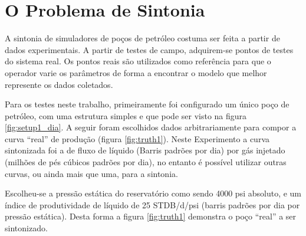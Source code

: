 
\chapter{O Problema de Sintonia} \label{chap:conc}
	

A sintonia de simuladores de poços de petróleo costuma ser feita a partir de dados experimentais. 
%
A partir de testes de campo, adquirem-se pontos de testes do sistema real.
%
Os pontos reais são utilizados como referência para que o operador varie os parâmetros de forma a encontrar o modelo que melhor represente os dados coletados.
%

Para os testes neste trabalho, primeiramente foi configurado um único poço de petróleo, com uma estrutura simples e que pode ser visto na figura \ref{fig:setup1_dia}.
% 
A seguir foram escolhidos dados arbitrariamente para compor a curva ``real'' de produção (figura \ref{fig:truth1}).
%
Neste Experimento a curva sintonizada foi a de fluxo de líquido (Barris padrões por dia) por gás injetado (milhões de pés cúbicos padrões por dia), no entanto é possível utilizar outras curvas, ou ainda mais que uma, para a sintonia.
%

Escolheu-se a pressão estática do reservatório como sendo 4000 psi absoluto, e um índice de produtividade de líquido de 25 STDB/d/psi (barris padrões por dia por pressão estática). 
%
Desta forma a figura \ref{fig:truth1} demonstra o poço ``real'' a ser sintonizado.



